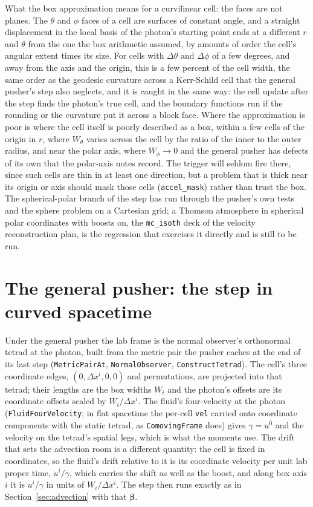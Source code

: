 \documentclass[11pt]{article}
\begin{document}
What the box approximation means for a curvilinear cell: the faces are not planes.  The
$\theta$ and $\phi$ faces of a cell are surfaces of constant angle, and a straight
displacement in the local basis of the photon's starting point ends at a different $r$
and $\theta$ from the one the box arithmetic assumed, by amounts of order the cell's
angular extent times its size.  For cells with $\Delta\theta$ and $\Delta\phi$ of a few
degrees, and away from the axis and the origin, this is a few percent of the cell
width, the same order as the geodesic curvature across a Kerr-Schild cell that the
general pusher's step also neglects, and it is caught in the same way: the cell update
after the step finds the photon's true cell, and the boundary functions run if the
rounding or the curvature put it across a block face.  Where the approximation is poor
is where the cell itself is poorly described as a box, within a few cells of the origin
in $r$, where $W_\theta$ varies across the cell by the ratio of the inner to the outer
radius, and near the polar axis, where $W_\phi\to0$ and the general pusher has defects
of its own that the polar-axis notes record.  The trigger will seldom fire there, since
such cells are thin in at least one direction, but a problem that is thick near its
origin or axis should mask those cells (\texttt{accel\_mask}) rather than trust the box.
The spherical-polar branch of the step has run through the pusher's own tests and the
sphere problem on a Cartesian grid; a Thomson atmosphere in spherical polar coordinates
with boosts on, the \texttt{mc\_isoth} deck of the velocity reconstruction plan, is the
regression that exercises it directly and is still to be run.

\section{The general pusher: the step in curved spacetime}
\label{sec:gr}

Under the general pusher the lab frame is the normal observer's orthonormal tetrad at the
photon, built from the metric pair the pusher caches at the end of its last step
(\texttt{MetricPairAt}, \texttt{NormalObserver}, \texttt{ConstructTetrad}).  The cell's
three coordinate edges, $(0,\Delta x^i,0,0)$ and permutations, are projected into that
tetrad; their lengths are the box widths $W_i$ and the photon's offsets are its
coordinate offsets scaled by $W_i/\Delta x^i$.  The fluid's four-velocity at the photon
(\texttt{FluidFourVelocity}; in flat spacetime the per-cell \texttt{vel} carried onto
coordinate components with the static tetrad, as \texttt{ComovingFrame} does) gives
$\gamma=u^{\hat0}$ and the velocity on the tetrad's spatial legs, which is what the
moments use.  The drift that sets the advection room is a different quantity: the cell
is fixed in coordinates, so the fluid's drift relative to it is its coordinate velocity
per unit lab proper time, $u^i/\gamma$, which carries the shift as well as the boost, and
along box axis $i$ it is $u^i/\gamma$ in units of $W_i/\Delta x^i$.  The step then runs
exactly as in Section~\ref{sec:advection} with that $\boldsymbol\beta$.
\end{document}
